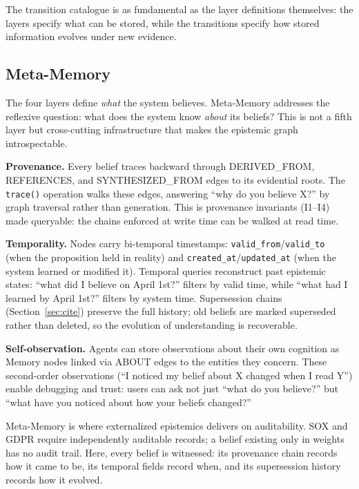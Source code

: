 \documentclass[11pt,letterpaper]{article}
\begin{document}
The transition catalogue is as fundamental as the layer definitions themselves: the layers specify what can be stored, while the transitions specify how stored information evolves under new evidence.

\subsection{Meta-Memory}

The four layers define \textit{what} the system believes. Meta-Memory addresses the reflexive question: what does the system know \textit{about} its beliefs? This is not a fifth layer but cross-cutting infrastructure that makes the epistemic graph introspectable.

\textbf{Provenance.} Every belief traces backward through DERIVED\_FROM, REFERENCES, and SYNTHESIZED\_FROM edges to its evidential roots. The \texttt{trace()} operation walks these edges, answering ``why do you believe X?'' by graph traversal rather than generation. This is provenance invariants (I1--I4) made queryable: the chains enforced at write time can be walked at read time.

\textbf{Temporality.} Nodes carry bi-temporal timestamps: \texttt{valid\_from}/\texttt{valid\_to} (when the proposition held in reality) and \texttt{created\_at}/\texttt{updated\_at} (when the system learned or modified it). Temporal queries reconstruct past epistemic states: ``what did I believe on April 1st?'' filters by valid time, while ``what had I learned by April 1st?'' filters by system time. Supersession chains (Section~\ref{sec:cite}) preserve the full history; old beliefs are marked superseded rather than deleted, so the evolution of understanding is recoverable.

\textbf{Self-observation.} Agents can store observations about their own cognition as Memory nodes linked via ABOUT edges to the entities they concern. These second-order observations (``I noticed my belief about X changed when I read Y'') enable debugging and trust: users can ask not just ``what do you believe?'' but ``what have you noticed about how your beliefs changed?''

Meta-Memory is where externalized epistemics delivers on auditability. SOX and GDPR require independently auditable records; a belief existing only in weights has no audit trail. Here, every belief is witnessed: its provenance chain records how it came to be, its temporal fields record when, and its supersession history records how it evolved.
\end{document}
